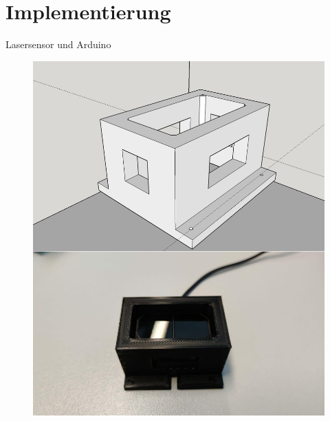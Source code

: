 \documentclass[10pt,ngerman]{beamer}
\begin{document}
\section{Implementierung}
\begin{frame}[fragile]{Lasersensor und Arduino}
  \begin{minipage}[t]{0.49\textwidth}
    \begin{figure}
      \centering
      \includegraphics[width=1\textwidth]{pics/thingiverse_3D.png}
    \end{figure}
  \end{minipage}
  \begin{minipage}[t]{0.49\textwidth}
    \begin{figure}
      \centering

\end{figure}
\end{minipage}
\end{frame}
\end{document}
